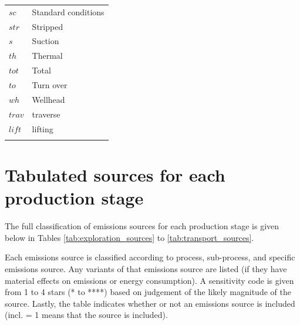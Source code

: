 \documentclass[11pt]{report}
\begin{document}
{{{{\begin{scriptsize}
\begin{supertabular*}{1\columnwidth}{p{0.2\columnwidth}p{0.75\columnwidth}}
$sc$ & Standard conditions\\
$str$ & Stripped\\
$s$ & Suction\\
$th$ & Thermal\\
$tot$ & Total\\
$to$ & Turn over\\
$wh$ & Wellhead\\
$trav$ & traverse\\
$lift$ & lifting\\
\\
\end{supertabular*}
\end{scriptsize}



\chapter{Tabulated sources for each production stage}\label{sec:app_sources_classification}

The full classification of emissions sources for each production stage is given below in Tables \ref{tab:exploration_sources} to \ref{tab:transport_sources}.

Each emissions source is classified according to process, sub-process, and specific emissions source. Any variants of that emissions source are listed (if they have material effects on emissions or energy consumption). A sensitivity code is given from 1 to 4 stars (* to ****) based on judgement of the likely magnitude of the source. Lastly, the table indicates whether or not an emissions source is included (incl. = 1 means that the source is included).

}}}}
\end{document}
